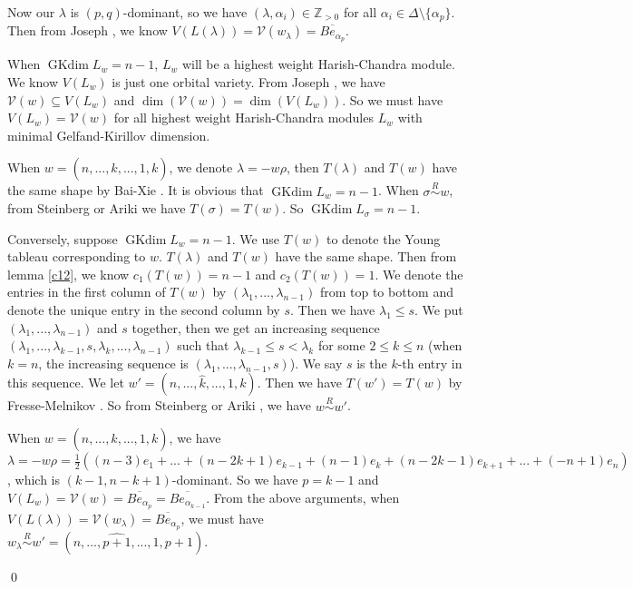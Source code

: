 \documentclass{amsart}[12pt]
\newtheorem{Rem}{Remark}[section]
\renewcommand{\subset}{\subseteq}
\newcommand{\gkd}{\operatorname{GKdim}}
\numberwithin{equation}{section}
\begin{document}
Now our $\lambda$ is $(p,q)$-dominant, so we have $(\lambda, \alpha_i)\in \mathbb{Z}_{>0}$ for all $\alpha_i \in \Delta \setminus \{\alpha_p\}$.
Then from Joseph \cite[Theorem 4.14]{Jo98}, we know $V( L(\lambda))=\mathcal{V}(w_{\lambda})=\overline{Be_{\alpha_{p}}}$.

When $\gkd L_w=n-1$,  $L_w$ will be a highest weight Harish-Chandra module. We know $V(L_w)$ is just one orbital variety. From Joseph \cite{Jo84}, we have $\mathcal{V}(w)\subset V(L_w)$ and  $\dim(\mathcal{V}(w))=\dim( V(L_w))$. So we must have $V(L_w)=\mathcal{V}(w)$ for all highest weight Harish-Chandra modules $L_w$ with minimal Gelfand-Kirillov dimension.

When  $w=(n,...,\hat{k},...,1,k)$, we denote $\lambda=-w\rho$, then $T(\lambda)$ and $T(w)$ have the same shape by Bai-Xie \cite{BX}. It is obvious that $\gkd L_w=n-1$. When $\sigma \stackrel{R}{\sim} w$, from Steinberg \cite{St} or Ariki \cite{Ar} we have $T(\sigma)=T(w)$. So   $\gkd L_{\sigma}=n-1$.

Conversely, suppose $\gkd L_w=n-1$. We use $T(w)$ to denote the Young tableau corresponding to $w$. $T(\lambda)$ and $T(w)$ have the same shape.  Then from lemma \ref{c12}, we know $c_1(T(w))=n-1$ and $c_2(T(w))=1$. We denote the entries in the first column of $T(w)$ by $(\lambda_1,...,\lambda_{n-1})$ from top to bottom and denote the unique entry in the second column by $s$. Then we have $\lambda_{1}\leq s$. We put $(\lambda_1,...,\lambda_{n-1})$ and $s$ together, then we get an increasing sequence $(\lambda_1,...,\lambda_{k-1},s,\lambda_{k},...,\lambda_{n-1})$ such that $ \lambda_{k-1}\leq s< \lambda_{k}$ for some $2\leq k\leq n$ (when $k=n$, the increasing sequence is $(\lambda_1,...,\lambda_{n-1},s)$). We say $s$ is the $k$-th entry in this sequence. We let $w'=(n,...,\hat{k},...,1,k)$. Then we have $T(w')=T(w)$ by Fresse-Melnikov \cite{FM}. So from Steinberg \cite{St} or Ariki \cite{Ar}, we have $w\stackrel{R}{\sim} w'$.

When  $w=(n,...,\hat{k},...,1,k)$, we have $\lambda=-w\rho=\frac{1}{2}((n-3)e_1+...+(n-2k+1)e_{k-1}+(n-1)e_k+(n-2k-1)e_{k+1}+...+(-n+1)e_n)$, which is $(k-1,n-k+1)$-dominant. So we have $p=k-1$ and $V(L_w)=\mathcal{V}(w)=\overline{Be_{\alpha_{p}}}=\overline{Be_{\alpha_{k-1}}}$.
From the above arguments, when  $V(L(\lambda))=\mathcal{V}(w_{\lambda})=\overline{Be_{\alpha_{p}}}$, we must have $w_{\lambda}\stackrel{R}{\sim} w'=(n,...,{\widehat{p+1}},...,1,p+1)$.


                                                     \qed
\end{document}
